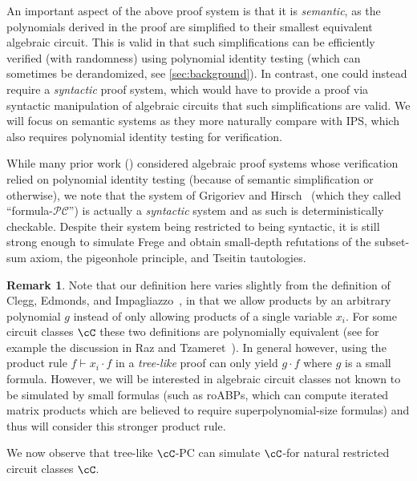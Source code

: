 \documentclass[11pt]{article}
\numberwithin{equation}{section}
\theoremstyle{definition}
\newtheorem{remark}[theorem]{Remark}
\theoremstyle{plain}
\begin{document}
An important aspect of the above proof system is that it is \emph{semantic}, as the polynomials derived in the proof are simplified to their smallest equivalent algebraic circuit.  This is  valid in that such simplifications can be efficiently verified (with randomness) using polynomial identity testing (which can sometimes be derandomized, see \autoref{sec:background}). In contrast, one could instead require a \emph{syntactic} proof system, which would have to provide a proof via syntactic manipulation of algebraic circuits that such simplifications are valid.  We will focus on semantic systems as they more naturally compare with IPS, which also requires polynomial identity testing for verification.

While many prior work (\cite{Pitassi97,RazTzameret08a,RazTzameret08b,Tzameret11,DBLP:journals/jacm/GrochowP18}) considered algebraic proof systems whose verification relied on polynomial identity testing (because of semantic simplification or otherwise), we note that the system of Grigoriev and Hirsch~\cite{GrigorievHirsch03} (which they called ``formula-$\mathcal{PC}$'') is actually a \emph{syntactic} system and as such %
is deterministically checkable. Despite their system being restricted to being syntactic, it is still strong enough to simulate Frege and obtain small-depth refutations of the subset-sum axiom, the pigeonhole principle, and Tseitin tautologies.

\begin{remark}
  Note that our definition here varies slightly from the definition of Clegg, Edmonds, and Impagliazzo~\cite{CleggEI96}, in that we allow products by an arbitrary polynomial $g$ instead of only allowing products of a single variable $x_i$.  For some circuit classes $\cC$ these two definitions are polynomially equivalent (see for example the discussion in Raz and Tzameret~\cite{RazTzameret08a}).  In general however, using the product rule $f\vdash x_i\cdot f$ in a \emph{tree-like} proof can only yield $g\cdot f$ where $g$ is a small formula. However, we will be interested in algebraic circuit classes not known to be simulated by small formulas (such as roABPs, which can compute iterated matrix products which are believed to require superpolynomial-size formulas) and
thus %
will consider this stronger product rule.
\end{remark}

We now observe that tree-like $\cC$-PC can simulate $\cC$-\lIPS for natural restricted circuit classes $\cC$.
\end{document}
